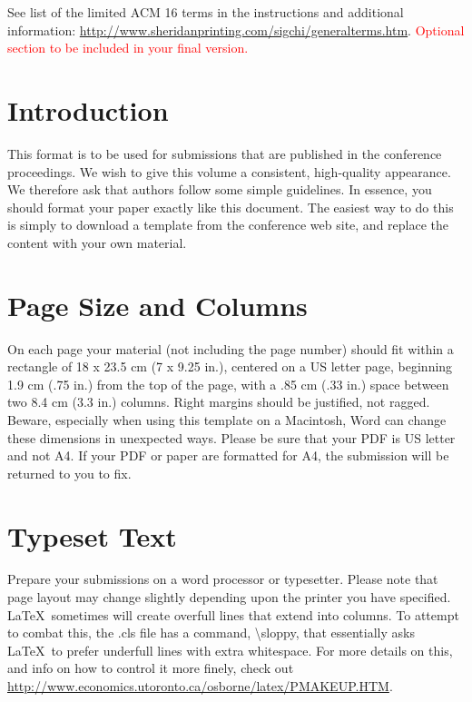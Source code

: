 \documentclass{sigchi-alternate}
\begin{document}

See list of the limited ACM 16 terms in the
instructions and additional information:
\url{http://www.sheridanprinting.com/sigchi/generalterms.htm}.
\textcolor{red}{Optional section to be included in your final version.}

\section{Introduction}

This format is to be used for submissions that are
published in the conference proceedings.  We wish to give
this volume a consistent, high-quality appearance. We
therefore ask that authors follow some simple
guidelines. In essence, you should format your paper
exactly like this document. The easiest way to do this is
simply to download a template from the conference web
site, and replace the content with your own material.

\section{Page Size and Columns}

On each page your material (not including the page number) should fit
within a rectangle of 18 x 23.5 cm (7 x 9.25 in.), centered on a US
letter page, beginning 1.9 cm (.75 in.) from the top of the page, with
a .85 cm (.33 in.) space between two 8.4 cm (3.3 in.) columns.  Right
margins should be justified, not ragged. Beware, especially when using
this template on a Macintosh, Word can change these dimensions in
unexpected ways. Please be sure that your PDF is US letter and not
A4. If your PDF or paper are formatted for A4, the submission will be
returned to you to fix.

\section{Typeset Text}

Prepare your submissions on a word processor or typesetter.  Please
note that page layout may change slightly depending upon the printer
you have specified.  \LaTeX\ sometimes will create overfull lines
that extend into columns.  To attempt to combat this, the .cls
file has a command, {\textbackslash}sloppy, that essentially asks
\LaTeX\ to prefer underfull lines with extra whitespace.  For more
details on this, and info on how to control it more finely, check out
{\url{http://www.economics.utoronto.ca/osborne/latex/PMAKEUP.HTM}}.
\end{document}

